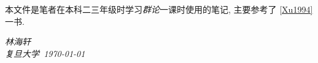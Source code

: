     本文件是笔者在本科二三年级时学习\emph{群论}一课时使用的笔记, 主要参考了 \ref{Xu1994} 一书.

    \vspace{2cm}
    \begin{flushright}
        \textit{林海轩} \\[1em]
        \textit{复旦大学\ \today}
    \end{flushright}